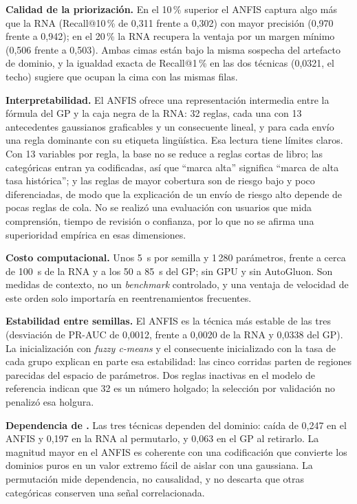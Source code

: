 \documentclass[conference]{IEEEtran}
\newcommand{\col}[1]{\texttt{\detokenize{#1}}}
\begin{document}
\textbf{Calidad de la priorización.} En el 10\,\% superior el ANFIS captura
algo más que la RNA (Recall@10\,\% de 0,311 frente a 0,302) con mayor
precisión (0,970 frente a 0,942); en el 20\,\% la RNA recupera la ventaja por
un margen mínimo (0,506 frente a 0,503). Ambas cimas están bajo la misma
sospecha del artefacto de dominio, y la igualdad exacta de Recall@1\,\% en
las dos técnicas (0,0321, el techo) sugiere que ocupan la cima con las mismas
filas.

\textbf{Interpretabilidad.} El ANFIS ofrece una representación intermedia
entre la fórmula del GP y la caja negra de la RNA: 32 reglas, cada una con
13 antecedentes gaussianos graficables y un consecuente lineal, y para cada
envío una regla dominante con su etiqueta lingüística. Esa lectura tiene
límites claros. Con 13 variables por regla, la base no se reduce a reglas
cortas de libro; las categóricas entran ya codificadas, así que ``marca
alta'' significa ``marca de alta tasa histórica''; y las reglas de mayor
cobertura son de riesgo bajo y poco diferenciadas, de modo que la explicación
de un envío de riesgo alto depende de pocas reglas de cola. No se realizó una
evaluación con usuarios que mida comprensión, tiempo de revisión o confianza,
por lo que no se afirma una superioridad empírica en esas dimensiones.

\textbf{Costo computacional.} Unos 5~s por semilla y 1\,280 parámetros,
frente a cerca de 100~s de la RNA y a los 50 a 85~s del GP; sin GPU y sin
AutoGluon. Son medidas de contexto, no un \textit{benchmark} controlado, y
una ventaja de velocidad de este orden solo importaría en reentrenamientos
frecuentes.

\textbf{Estabilidad entre semillas.} El ANFIS es la técnica más estable de
las tres (desviación de PR-AUC de 0,0012, frente a 0,0020 de la RNA y 0,0338
del GP). La inicialización con \textit{fuzzy c-means} y el consecuente
inicializado con la tasa de cada grupo explican en parte esa estabilidad: las
cinco corridas parten de regiones parecidas del espacio de parámetros. Dos
reglas inactivas en el modelo de referencia indican que 32 es un número
holgado; la selección por validación no penalizó esa holgura.

\textbf{Dependencia de \col{DOM_DOMAIN_ID}.} Las tres técnicas dependen del
dominio: caída de 0,247 en el ANFIS y 0,197 en la RNA al permutarlo, y
0,063 en el GP al retirarlo. La magnitud mayor en el ANFIS es coherente con
una codificación que convierte los dominios puros en un valor extremo fácil
de aislar con una gaussiana. La permutación mide dependencia, no causalidad,
y no descarta que otras categóricas conserven una señal correlacionada.
\end{document}
